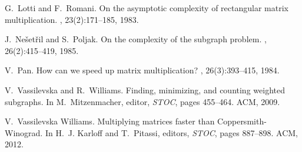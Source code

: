\documentclass{amsart}
\begin{document}
\begin{thebibliography}{10}
G.~Lotti and F.~Romani.
\newblock On the asymptotic complexity of rectangular matrix multiplication.
, 23(2):171--185, 1983.

J.~Ne{\v{s}}et{\v{r}}il and S.~Poljak.
\newblock On the complexity of the subgraph problem.
, 26(2):415--419, 1985.

V.~Pan.
\newblock How can we speed up matrix multiplication?
, 26(3):393--415, 1984.

V.~Vassilevska and R.~Williams.
\newblock Finding, minimizing, and counting weighted subgraphs.
\newblock In M.~Mitzenmacher, editor, {\em STOC}, pages 455--464. ACM, 2009.

V.~{Vassilevska Williams}.
\newblock Multiplying matrices faster than {C}oppersmith-{W}inograd.
\newblock In H.~J. Karloff and T.~Pitassi, editors, {\em STOC}, pages 887--898.
  ACM, 2012.

\end{thebibliography}
\end{document}
